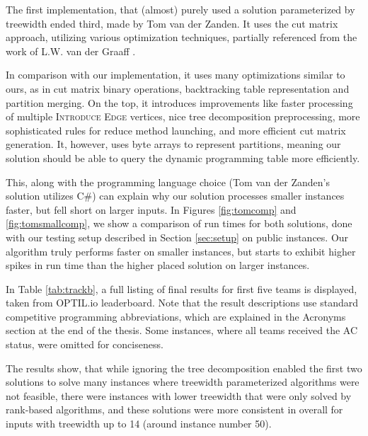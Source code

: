 \documentclass[thesis=M,english,hidelinks]{FITthesis}[2012/10/20]
\theoremstyle{definition}
\begin{document}
The first implementation, that (almost) purely used a solution parameterized by treewidth ended third, made by Tom van
der Zanden. It uses the cut matrix approach, utilizing various optimization techniques, partially referenced from the
work of L.W. van der Graaff \cite{Graaff2015}.

In comparison with our implementation, it uses many optimizations similar to ours, as in cut matrix binary operations,
backtracking table representation and partition merging. On the top, it introduces improvements like faster processing
of multiple \textsc{Introduce Edge} vertices, nice tree decomposition preprocessing, more sophisticated rules for reduce
method launching, and more efficient cut matrix generation. It, however, uses byte arrays to represent partitions, meaning
our solution should be able to query the dynamic programming table more efficiently.

This, along with the programming language choice (Tom van der Zanden's solution utilizes C\#) can explain why our
solution processes smaller instances faster, but fell short on larger inputs. In Figures \ref{fig:tomcomp} and
\ref{fig:tomsmallcomp}, we show a comparison of run times for both solutions, done with our testing setup described in
Section \ref{sec:setup} on public instances. Our algorithm truly performs faster on smaller instances, but starts to
exhibit higher spikes in run time than the higher placed solution on larger instances.

In Table \ref{tab:trackb}, a full listing of final results for first five teams is displayed, taken from OPTIL.io
\cite{OptilIo} leaderboard. Note that the result descriptions use standard competitive programming abbreviations, which
are explained in the Acronyms section at the end of the thesis. Some instances, where all teams received the AC status,
were omitted for conciseness.

The results show, that while ignoring the tree decomposition enabled the first two solutions to solve many instances
where treewidth parameterized algorithms were not feasible, there were instances with lower treewidth that were only
solved by rank-based algorithms, and these solutions were more consistent in overall for inputs with treewidth up to 14
(around instance number 50).
\end{document}
